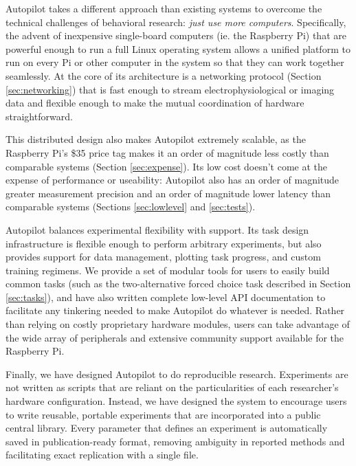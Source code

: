 \documentclass[nohyper, justified, notitlepage, marginals=raggedright,twoside=false,debug]{tufte-autopilot}
\begin{document}
Autopilot takes a different approach than existing systems to overcome the technical challenges of behavioral research: \textit{just use more computers}. Specifically, the advent of inexpensive single-board computers (ie. the Raspberry Pi) that are powerful enough to run a full Linux operating system allows a unified platform to run on every Pi or other computer in the system so that they can work together seamlessly. At the core of its architecture is a networking protocol (Section \ref{sec:networking}) that is fast enough to stream electrophysiological or imaging data and flexible enough to make the mutual coordination of hardware straightforward. 

This distributed design also makes Autopilot extremely scalable, as the Raspberry Pi's \$35 price tag makes it an order of magnitude less costly than comparable systems (Section \ref{sec:expense}). Its low cost doesn't come at the expense of performance or useability: Autopilot also has an order of magnitude greater measurement precision and an order of magnitude lower latency than comparable systems (Sections \ref{sec:lowlevel} and \ref{sec:tests}).

Autopilot balances experimental flexibility with support. Its task design infrastructure is flexible enough to perform arbitrary experiments, but also provides support for data management, plotting task progress, and custom training regimens. We provide a set of modular tools for users to easily build common tasks (such as the two-alternative forced choice task described in Section \ref{sec:tasks}), and have also written complete low-level API documentation to facilitate any tinkering needed to make Autopilot do whatever is needed. Rather than relying on costly proprietary hardware modules, users can take advantage of the wide array of peripherals and extensive community support available for the Raspberry Pi. 

Finally, we have designed Autopilot to do reproducible research. Experiments are not written as scripts that are reliant on the particularities of each researcher's hardware configuration. Instead, we have designed the system to encourage users to write reusable, portable experiments that are incorporated into a public central library. Every parameter that defines an experiment is automatically saved in  publication-ready format, removing ambiguity in reported methods and facilitating exact replication with a single file.

\vspace{12pt}
\end{document}
